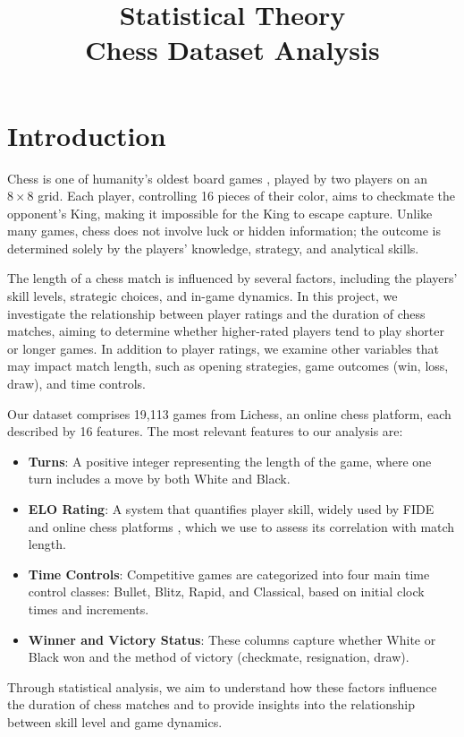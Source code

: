 \documentclass[conference]{IEEEtran}
\title{
Statistical Theory\\
Chess Dataset Analysis
}
\author{
   \IEEEauthorblockN{Dor Boker, Itamar Nakar}
   \IEEEauthorblockA{
      I.D: 209271279 , 325829000\\
      Email: dorboker@gmail.com, itamar.nakar@gmail.com
   }
}
\begin{document}
\maketitle

\section{Introduction}
Chess is one of humanity's oldest board games \cite{chesswiki}, played by two players on an $8\times8$ grid. Each player, controlling 16 pieces of their color, aims to checkmate the opponent's King, making it impossible for the King to escape capture. Unlike many games, chess does not involve luck or hidden information; the outcome is determined solely by the players' knowledge, strategy, and analytical skills.

The length of a chess match is influenced by several factors, including the players' skill levels, strategic choices, and in-game dynamics. In this project, we investigate the relationship between player ratings and the duration of chess matches, aiming to determine whether higher-rated players tend to play shorter or longer games. In addition to player ratings, we examine other variables that may impact match length, such as opening strategies, game outcomes (win, loss, draw), and time controls.

Our dataset \cite{dataset} comprises 19,113 games from Lichess, an online chess platform, each described by 16 features. The most relevant features to our analysis are: \begin{itemize} \item \textbf{Turns}: A positive integer representing the length of the game, where one turn includes a move by both White and Black. \item \textbf{ELO Rating}: A system that quantifies player skill, widely used by FIDE and online chess platforms \cite{ELO}, which we use to assess its correlation with match length. \item \textbf{Time Controls}: Competitive games are categorized into four main time control classes: Bullet, Blitz, Rapid, and Classical, based on initial clock times and increments. \item \textbf{Winner and Victory Status}: These columns capture whether White or Black won and the method of victory (checkmate, resignation, draw). \end{itemize} Through statistical analysis, we aim to understand how these factors influence the duration of chess matches and to provide insights into the relationship between skill level and game dynamics. 
\end{document}
